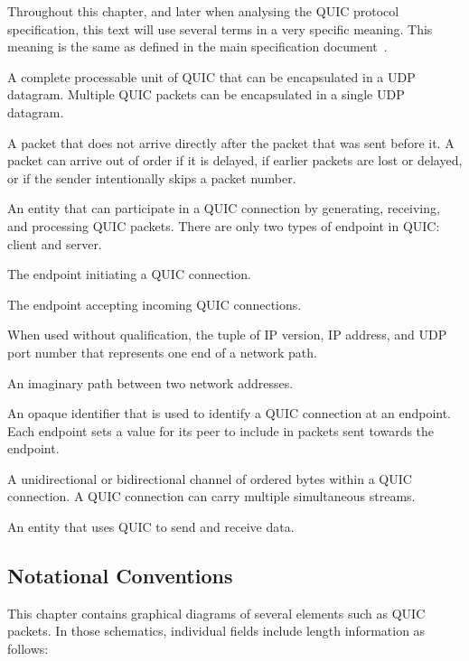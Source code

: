 Throughout this chapter, and later when analysing the QUIC protocol specification, this text will
use several terms in a very specific meaning. This meaning is the same as defined in the
main specification document~\cite[Section~1.2]{draft-ietf-quic-transport}.

\begin{description}

    A complete processable unit of QUIC that can be
  encapsulated in a UDP datagram.  Multiple QUIC packets can be
  encapsulated in a single UDP datagram.

    A packet that does not arrive directly after the packet that was
  sent before it.  A packet can arrive out of order if it is delayed, if earlier packets are
  lost or delayed, or if the sender intentionally skips a packet number.

    An entity that can participate in a QUIC connection by
  generating, receiving, and processing QUIC packets.  There are
  only two types of endpoint in QUIC: client and server.

    The endpoint initiating a QUIC connection.

    The endpoint accepting incoming QUIC connections.

    When used without qualification, the tuple of IP version,
  IP address, and UDP port number that represents one end of a network path.

   An imaginary path between two network addresses.

    An opaque identifier that is used to identify a QUIC
  connection at an endpoint.  Each endpoint sets a value for its
  peer to include in packets sent towards the endpoint.

    A unidirectional or bidirectional channel of ordered bytes
  within a QUIC connection.  A QUIC connection can carry multiple
  simultaneous streams.

    An entity that uses QUIC to send and receive data.

\end{description}

\subsection{Notational Conventions}

This chapter contains graphical diagrams of several elements such as QUIC packets. In those
schematics, individual fields include length information as follows:

